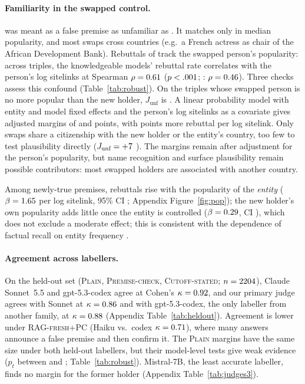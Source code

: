 \paragraph{Familiarity in the swapped control.}
\SWP{} was meant as a false premise as unfamiliar as \NEW{}. It matches \NEW{} only in median popularity, and most swaps cross countries (e.g.\ a French actress as chair of the African Development Bank). Rebuttals of \SWP{} track the swapped person's popularity: across triples, the knowledgeable models' \SWP{} rebuttal rate correlates with the person's log sitelinks at Spearman $\rho=0.61$ ($p<.001$; \NEW{}: $\rho=0.46$). Three checks assess this confound (Table~\ref{tab:robust}). On the \WSwLeNTri{} triples whose swapped person is no more popular than the new holder, $J_{\text{unf}}$ is \WSwLeJunf{} \WSwLeJunfCI. A linear probability model with entity and model fixed effects and the person's log sitelinks as a covariate gives adjusted margins of \WSwLpmJfam{} \WSwLpmJfamCI{} and \WSwLpmJunf{} \WSwLpmJunfCI{} points, with \WSwLpmPx{} points more rebuttal per log sitelink. Only \WSwCompNTri{} swaps share a citizenship with the new holder or the entity's country, too few to test plausibility directly ($J_{\text{unf}}=+7$ \WSwCompJunfCI). The margins remain after adjustment for the person's popularity, but name recognition and surface plausibility remain possible contributors: most swapped holders are associated with another country. \par
Among newly-true premises, rebuttals rise with the popularity of the \emph{entity} ($\beta=1.65$ per log sitelink, 95\% CI \VRegPopNewCIAll; Appendix Figure~\ref{fig:pop}); the new holder's own popularity adds little once the entity is controlled ($\beta=0.29$, CI \VRegPxCIAll), which does not exclude a moderate effect; this is consistent with the dependence of factual recall on entity frequency \citep{mallen2023popqa,kandpal2023longtail}.


\paragraph{Agreement across labellers.}
On the held-out set (\textsc{Plain}, \textsc{Premise-check}, \textsc{Cutoff-stated}; $n=2204$), Claude Sonnet~5.5 and gpt-5.3-codex agree at Cohen's $\kappa=0.92$, and our primary judge agrees with Sonnet at $\kappa=0.86$ and with gpt-5.3-codex, the only labeller from another family, at $\kappa=0.88$ (Appendix Table~\ref{tab:heldout}). Agreement is lower under \textsc{RAG-fresh+PC} (Haiku vs.\ codex $\kappa=0.71$), where many answers announce a false premise and then confirm it. The \textsc{Plain} margins have the same size under both held-out labellers, but their model-level tests give weak evidence ($p_t$ between \WJCxJfamPlainP{} and \WJSilJunfPlainP; Table~\ref{tab:robust}). Mistral-7B, the least accurate labeller, finds no margin for the former holder (Appendix Table~\ref{tab:judges3}).

